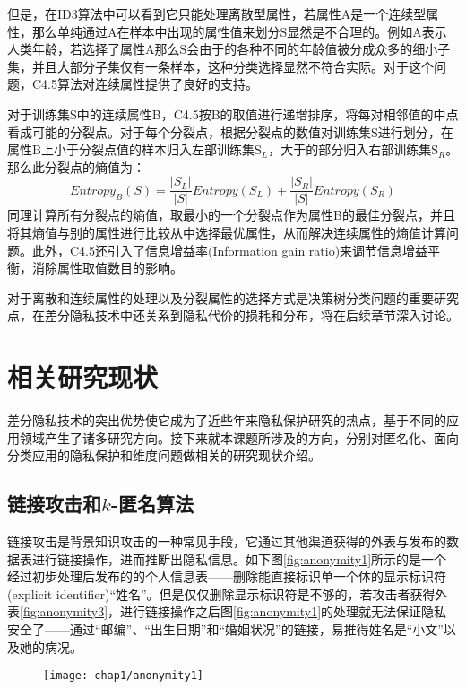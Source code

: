 但是，在ID3算法中可以看到它只能处理离散型属性，若属性A是一个连续型属性，那么单纯通过A在样本中出现的属性值来划分S显然是不合理的。例如A表示人类年龄，若选择了属性A那么S会由于的各种不同的年龄值被分成众多的细小子集，并且大部分子集仅有一条样本，这种分类选择显然不符合实际。对于这个问题，C4.5算法对连续属性提供了良好的支持。

对于训练集S中的连续属性B，C4.5按B的取值进行递增排序，将每对相邻值的中点看成可能的分裂点。对于每个分裂点，根据分裂点的数值对训练集S进行划分，在属性B上小于分裂点值的样本归入左部训练集S$_{L}$，大于的部分归入右部训练集S$_{R}$。那么此分裂点的熵值为：
\[
	Entropy_{B}(S) = \frac{|S_{L}|}{|S|}Entropy(S_{L})+\frac{|S_{R}|}{|S|}Entropy(S_{R})
\]
同理计算所有分裂点的熵值，取最小的一个分裂点作为属性B的最佳分裂点，并且将其熵值与别的属性进行比较从中选择最优属性，从而解决连续属性的熵值计算问题。此外，C4.5还引入了信息增益率(Information gain ratio)来调节信息增益平衡，消除属性取值数目的影响。

对于离散和连续属性的处理以及分裂属性的选择方式是决策树分类问题的重要研究点，在差分隐私技术中还关系到隐私代价的损耗和分布，将在后续章节深入讨论。

\section{相关研究现状} %

差分隐私技术的突出优势使它成为了近些年来隐私保护研究的热点，基于不同的应用领域产生了诸多研究方向。接下来就本课题所涉及的方向，分别对匿名化、面向分类应用的隐私保护和维度问题做相关的研究现状介绍。

\subsection{链接攻击和$k$-匿名算法}  %

链接攻击是背景知识攻击\cite{compounding attack}\cite{background attack}的一种常见手段，它通过其他渠道获得的外表与发布的数据表进行链接操作，进而推断出隐私信息。如下图\ref{fig:anonymity1}所示的是一个经过初步处理后发布的的个人信息表——删除能直接标识单一个体的显示标识符(explicit identifier)“姓名”。但是仅仅删除显示标识符是不够的，若攻击者获得外表\ref{fig:anonymity3}，进行链接操作之后图\ref{fig:anonymity1}的处理就无法保证隐私安全了——通过“邮编”、“出生日期”和“婚姻状况”的链接，易推得姓名是“小文”以及她的病况。

\begin{figure}[!htp]
	\centering
	\texttt{[image: chap1/anonymity1]}
\end{figure}

